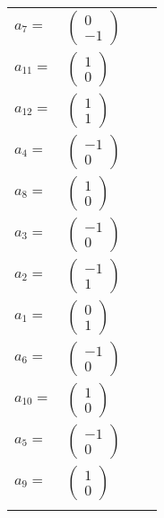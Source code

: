 \documentclass[1p]{elsarticle_modified}
\theoremstyle{definition}
\begin{document}
\begin{tabular}{m{7pt} m{180pt} m{7pt} m{180pt} }
\flushright $a_{7}=$&$\begin{pmatrix}0\\-1\end{pmatrix}$ \\
\flushright $a_{11}=$&$\begin{pmatrix}1\\0\end{pmatrix}$ \\
\flushright $a_{12}=$&$\begin{pmatrix}1\\1\end{pmatrix}$ \\
\flushright $a_{4}=$&$\begin{pmatrix}-1\\0\end{pmatrix}$ \\
\flushright $a_{8}=$&$\begin{pmatrix}1\\0\end{pmatrix}$ \\
\flushright $a_{3}=$&$\begin{pmatrix}-1\\0\end{pmatrix}$ \\
\flushright $a_{2}=$&$\begin{pmatrix}-1\\1\end{pmatrix}$ \\
\flushright $a_{1}=$&$\begin{pmatrix}0\\1\end{pmatrix}$ \\
\flushright $a_{6}=$&$\begin{pmatrix}-1\\0\end{pmatrix}$ \\
\flushright $a_{10}=$&$\begin{pmatrix}1\\0\end{pmatrix}$ \\
\flushright $a_{5}=$&$\begin{pmatrix}-1\\0\end{pmatrix}$ \\
\flushright $a_{9}=$&$\begin{pmatrix}1\\0\end{pmatrix}$\\&\end{tabular}
\end{document}
